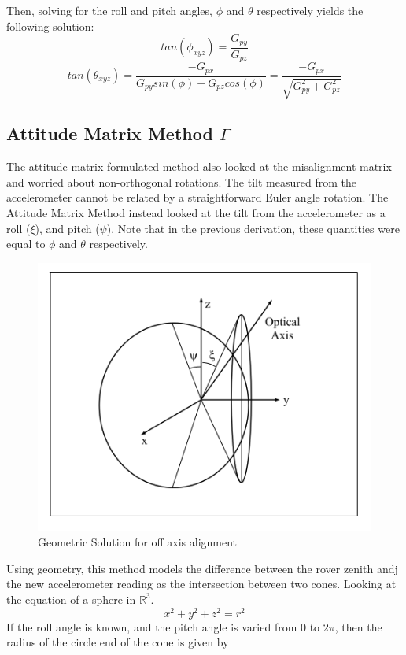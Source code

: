 \documentclass[12pt,a4paper]{book}
\begin{document}
Then, solving for the roll and pitch angles, $\phi$ and $\theta$ respectively yields the following solution:
\begin{equation}
tan(\phi_{xyz}) = \frac{G_{py}}{G_{pz}}
\end{equation}
\begin{equation}
tan(\theta_{xyz}) = \frac{-G_{px}}{G_{py}sin(\phi)+G_{pz}cos(\phi)}=\frac{-G_{px}}{\sqrt{G_{py}^{2} + G_{pz}^{2}}}
\end{equation}
\subsection{Attitude Matrix Method $\Gamma$}
The attitude matrix formulated method also looked at the misalignment matrix and worried about non-orthogonal rotations.  The tilt measured from the accelerometer cannot be related by a straightforward Euler angle rotation.  The Attitude Matrix Method instead looked at the tilt from the accelerometer as a roll ($\xi$), and pitch ($\psi$).  Note that in the previous derivation, these quantities were equal to $\phi$ and $\theta$ respectively.

\begin{figure}[h!]
\centering
\includegraphics[scale=0.4]{cones.png}
\caption{Geometric Solution for off axis alignment}
\label{f:cones}
\end{figure}

Using geometry, this method models the difference between the rover zenith andj the new accelerometer reading as the intersection between two cones.  Looking at the equation of a sphere in $\mathbb{R}^{3}$.  
\begin{equation}
x^{2} + y^{2} + z^{2} = r^{2}
\end{equation}
If the roll angle is known, and the pitch angle is varied from 0 to $2\pi$, then the radius of the circle end of the cone is given by 
\end{document}
